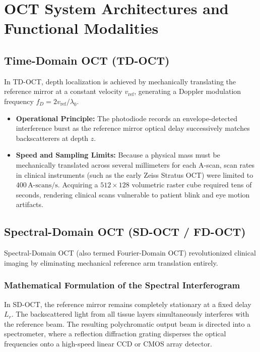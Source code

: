 \documentclass[11pt,a4paper]{article}
\begin{document}
\section{OCT System Architectures and Functional Modalities}

\subsection{Time-Domain OCT (TD-OCT)}

In TD-OCT, depth localization is achieved by mechanically translating the reference mirror at a constant velocity $v_{\text{ref}}$, generating a Doppler modulation frequency $f_D = 2 v_{\text{ref}} / \lambda_0$.
\begin{itemize}[leftmargin=*]
    \item \textbf{Operational Principle:} The photodiode records an envelope-detected interference burst as the reference mirror optical delay successively matches backscatterers at depth $z$.
    \item \textbf{Speed and Sampling Limits:} Because a physical mass must be mechanically translated across several millimeters for each A-scan, scan rates in clinical instruments (such as the early Zeiss Stratus OCT) were limited to $400\,\text{A-scans/s}$. Acquiring a $512 \times 128$ volumetric raster cube required tens of seconds, rendering clinical scans vulnerable to patient blink and eye motion artifacts.
\end{itemize}

\subsection{Spectral-Domain OCT (SD-OCT / FD-OCT)}

Spectral-Domain OCT (also termed Fourier-Domain OCT) revolutionized clinical imaging by eliminating mechanical reference arm translation entirely.

\subsubsection{Mathematical Formulation of the Spectral Interferogram}
In SD-OCT, the reference mirror remains completely stationary at a fixed delay $L_r$. The backscattered light from all tissue layers simultaneously interferes with the reference beam. The resulting polychromatic output beam is directed into a spectrometer, where a reflection diffraction grating disperses the optical frequencies onto a high-speed linear CCD or CMOS array detector.
\end{document}
